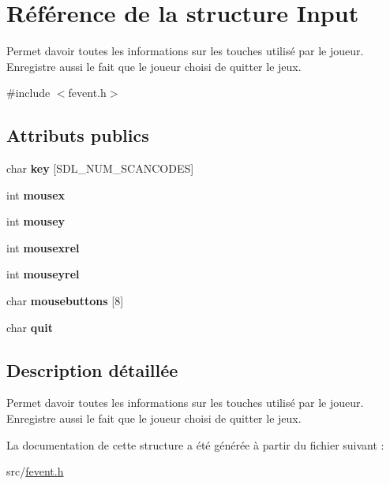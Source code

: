 \hypertarget{structInput}{}\section{Référence de la structure Input}
\label{structInput}


Permet d\textquotesingle{}avoir toutes les informations sur les touches utilisé par le joueur. Enregistre aussi le fait que le joueur choisi de quitter le jeux.  




{\ttfamily \#include $<$fevent.\+h$>$}

\subsection*{Attributs publics}
\begin{DoxyCompactItemize}
\item 
\mbox{\label{structInput_a0f745d131d2ec76603d2026341886b32}} 
char {\bfseries key} \mbox{[}S\+D\+L\+\_\+\+N\+U\+M\+\_\+\+S\+C\+A\+N\+C\+O\+D\+ES\mbox{]}
\item 
\mbox{\label{structInput_a332eaea23f6cb9689caaa189b11efef7}} 
int {\bfseries mousex}
\item 
\mbox{\label{structInput_a8ef4889d960150cf103f78639584c73b}} 
int {\bfseries mousey}
\item 
\mbox{\label{structInput_af80e916ff6c3b891d61f39a89ad12aa8}} 
int {\bfseries mousexrel}
\item 
\mbox{\label{structInput_a59f556c09868f3358e3716e5968f9965}} 
int {\bfseries mouseyrel}
\item 
\mbox{\label{structInput_ade8f5116b1a4c052fd39f50c849a3be6}} 
char {\bfseries mousebuttons} \mbox{[}8\mbox{]}
\item 
\mbox{\label{structInput_a64fa5d631e4b6f767d8c3dfede7126c3}} 
char {\bfseries quit}
\end{DoxyCompactItemize}


\subsection{Description détaillée}
Permet d\textquotesingle{}avoir toutes les informations sur les touches utilisé par le joueur. Enregistre aussi le fait que le joueur choisi de quitter le jeux. 

La documentation de cette structure a été générée à partir du fichier suivant \+:\begin{DoxyCompactItemize}
\item 
src/\hyperlink{fevent_8h}{fevent.\+h}\end{DoxyCompactItemize}
